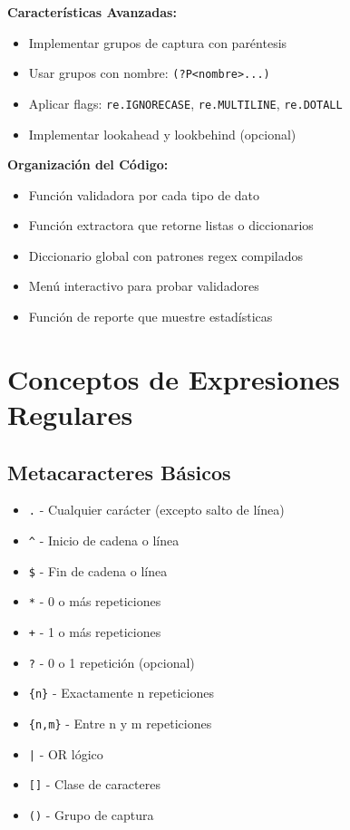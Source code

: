\documentclass[11pt,letterpaper]{article}
\begin{document}
\textbf{Características Avanzadas:}
\begin{itemize}
    \item Implementar grupos de captura con paréntesis
    \item Usar grupos con nombre: \texttt{(?P<nombre>...)}
    \item Aplicar flags: \texttt{re.IGNORECASE}, \texttt{re.MULTILINE}, \texttt{re.DOTALL}
    \item Implementar lookahead y lookbehind (opcional)
\end{itemize}

\textbf{Organización del Código:}
\begin{itemize}
    \item Función validadora por cada tipo de dato
    \item Función extractora que retorne listas o diccionarios
    \item Diccionario global con patrones regex compilados
    \item Menú interactivo para probar validadores
    \item Función de reporte que muestre estadísticas
\end{itemize}

\section{Conceptos de Expresiones Regulares}

\subsection{Metacaracteres Básicos}

\begin{itemize}
    \item \texttt{.} - Cualquier carácter (excepto salto de línea)
    \item \texttt{\^{}} - Inicio de cadena o línea
    \item \texttt{\$} - Fin de cadena o línea
    \item \texttt{*} - 0 o más repeticiones
    \item \texttt{+} - 1 o más repeticiones
    \item \texttt{?} - 0 o 1 repetición (opcional)
    \item \texttt{\{n\}} - Exactamente n repeticiones
    \item \texttt{\{n,m\}} - Entre n y m repeticiones
    \item \texttt{|} - OR lógico
    \item \texttt{[]} - Clase de caracteres
    \item \texttt{()} - Grupo de captura
\end{itemize}
\end{document}
